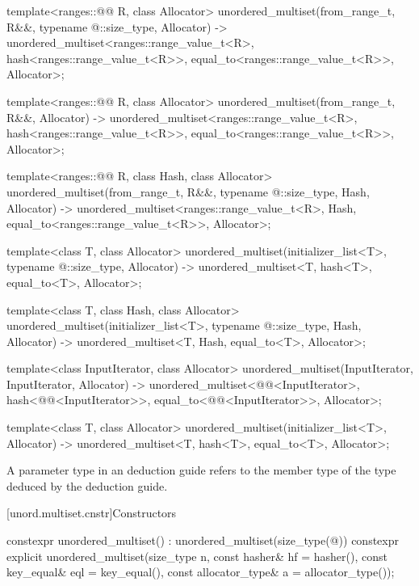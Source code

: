 \begin{codeblock}
{  template<ranges::@@ R, class Allocator>
    unordered_multiset(from_range_t, R&&, typename @\seebelow@::size_type, Allocator)
      -> unordered_multiset<ranges::range_value_t<R>, hash<ranges::range_value_t<R>>,
                            equal_to<ranges::range_value_t<R>>, Allocator>;

  template<ranges::@@ R, class Allocator>
    unordered_multiset(from_range_t, R&&, Allocator)
      -> unordered_multiset<ranges::range_value_t<R>, hash<ranges::range_value_t<R>>,
                            equal_to<ranges::range_value_t<R>>, Allocator>;

  template<ranges::@@ R, class Hash, class Allocator>
    unordered_multiset(from_range_t, R&&, typename @\seebelow@::size_type, Hash, Allocator)
      -> unordered_multiset<ranges::range_value_t<R>, Hash, equal_to<ranges::range_value_t<R>>,
                            Allocator>;

  template<class T, class Allocator>
    unordered_multiset(initializer_list<T>, typename @\seebelow@::size_type, Allocator)
      -> unordered_multiset<T, hash<T>, equal_to<T>, Allocator>;

  template<class T, class Hash, class Allocator>
    unordered_multiset(initializer_list<T>, typename @\seebelow@::size_type, Hash, Allocator)
      -> unordered_multiset<T, Hash, equal_to<T>, Allocator>;

  template<class InputIterator, class Allocator>
    unordered_multiset(InputIterator, InputIterator, Allocator)
      -> unordered_multiset<@@<InputIterator>,
                            hash<@@<InputIterator>>,
                            equal_to<@@<InputIterator>>,
                            Allocator>;

  template<class T, class Allocator>
    unordered_multiset(initializer_list<T>, Allocator)
      -> unordered_multiset<T, hash<T>, equal_to<T>, Allocator>;
}
\end{codeblock}

\pnum
A  parameter type in an  deduction guide
refers to the  member type of
the type deduced by the deduction guide.

[unord.multiset.cnstr]{Constructors}

%
\begin{itemdecl}
constexpr unordered_multiset() : unordered_multiset(size_type(@\seebelow@)) { }
constexpr explicit unordered_multiset(size_type n, const hasher& hf = hasher(),
                                      const key_equal& eql = key_equal(),
                                      const allocator_type& a = allocator_type());
\end{itemdecl}

